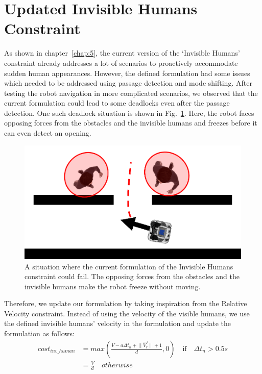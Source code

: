 \section{Updated Invisible Humans Constraint}
\hspace{\parindent} As shown in chapter~\ref{chap:5}, the current version of the `Invisible Humans' constraint already addresses a lot of scenarios to proactively accommodate sudden human appearances. However, the defined formulation had some issues which needed to be addressed using passage detection and mode shifting. After testing the robot navigation in more complicated scenarios, we observed that the current formulation could lead to some deadlocks even after the passage detection. One such deadlock situation is shown in Fig.~\ref{fig:inv_fail}. Here, the robot faces opposing forces from the obstacles and the invisible humans and freezes before it can even detect an opening.
\begin{figure}[h]
    \centering
    \includegraphics[width=0.8\columnwidth]{images/appendix/inv/updated_inv.png}
    \caption{A situation where the current formulation of the Invisible Humans constraint could fail. The opposing forces from the obstacles and the invisible humans make the robot freeze without moving.}
    \label{fig:inv_fail}
\end{figure}
Therefore, we update our formulation by taking inspiration from the Relative Velocity constraint. Instead of using the velocity of the visible humans, we use the defined invisible humans' velocity in the formulation and update the formulation as follows:
\begin{equation}
\begin{split}
cost_{inv\_human} &= max\left(\frac{V-a\Delta t_n+\lVert\overrightarrow{V_r}\rVert+1}{d}, 0\right)\quad \text{if}\quad \Delta t_n> 0.5s\\
                &= \frac{V}{d}\quad otherwise
\end{split}
\label{updated_inv_eq}
\end{equation}


